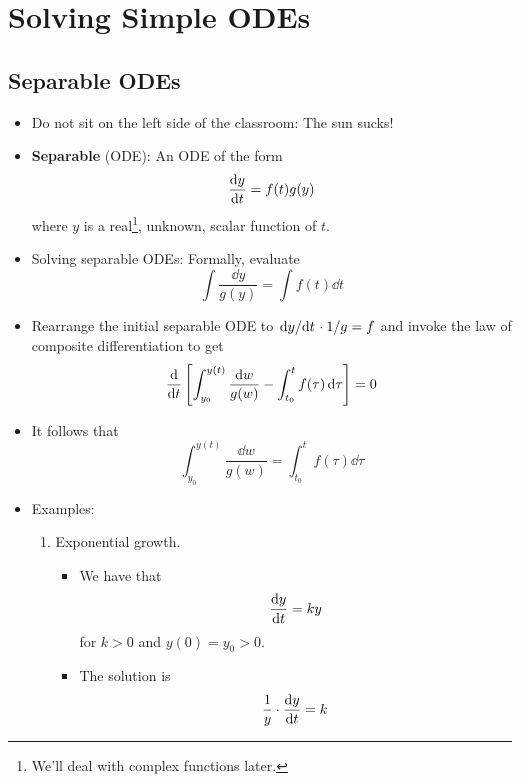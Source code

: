 \documentclass[../notes.tex]{subfiles}
\begin{document}
\chapter{Solving Simple ODEs}
\section{Separable ODEs}
\begin{itemize}
    \item {}Do not sit on the left side of the classroom: The sun sucks!
    \item \textbf{Separable} (ODE): An ODE of the form
    \begin{equation*}
        \dv{y}{t} = f(t)g(y)
    \end{equation*}
    where $y$ is a real\footnote{We'll deal with complex functions later.}, unknown, scalar function of $t$.
    \item Solving separable ODEs: Formally, evaluate
    \begin{equation*}
        \int\frac{\dd{y}}{g(y)} = \int f(t)\dd{t}
    \end{equation*}
    \item Rearrange the initial separable ODE to $\dv*{y}{t}\cdot 1/g=f$ and invoke the law of composite differentiation to get
    \begin{equation*}
        \dv{t}\left[ \int_{y_0}^{y(t)}\frac{\dd{w}}{g(w)}-\int_{t_0}^tf(\tau)\dd{\tau} \right] = 0
    \end{equation*}
    \item It follows that
    \begin{equation*}
        \int_{y_0}^{y(t)}\frac{\dd{w}}{g(w)} = \int_{t_0}^tf(\tau)\dd{\tau}
    \end{equation*}
    \item Examples:
    \begin{enumerate}
        \item Exponential growth.
        \begin{itemize}
            \item We have that
            \begin{equation*}
                \dv{y}{t} = ky
            \end{equation*}
            for $k>0$ and $y(0)=y_0>0$.
            \item The solution is
            \begin{align*}
                \frac{1}{y}\cdot\dv{y}{t} &= k\\

\end{align*}
\end{itemize}
\end{enumerate}
\end{itemize}
\end{document}
